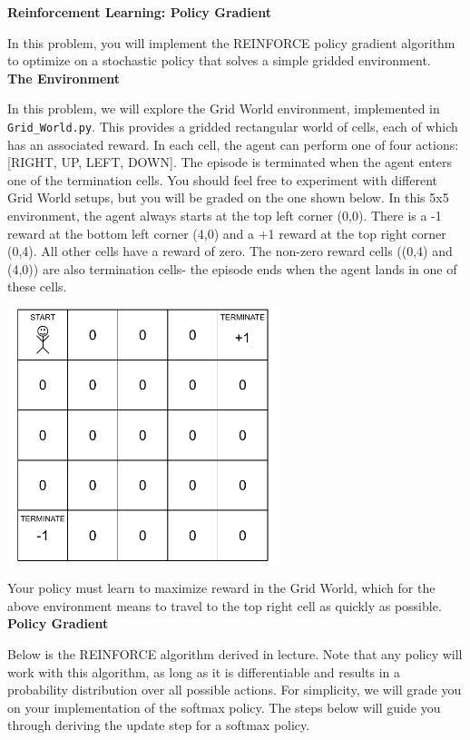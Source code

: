
\item {\bf Reinforcement Learning: Policy Gradient}

In this problem, you will implement the REINFORCE policy gradient algorithm to optimize on a stochastic policy that solves a simple gridded environment.\\

\textbf{The Environment}

In this problem, we will explore the Grid World environment, implemented in {\tt Grid\_World.py}.  This provides a gridded rectangular world of cells, each of which has an associated reward.  In each cell, the agent can perform one of four actions: [RIGHT, UP, LEFT, DOWN].  The episode is terminated when the agent enters one of the termination cells.  You should feel free to experiment with different Grid World setups, but you will be graded on the one shown below.  In this 5x5 environment, the agent always starts at the top left corner (0,0).  There is a -1 reward at the bottom left corner (4,0) and a +1 reward at the top right corner (0,4).  All other cells have a reward of zero.  The non-zero reward cells ((0,4) and (4,0)) are also termination cells- the episode ends when the agent lands in one of these cells.

\begin{center}
  \includegraphics[width=8cm]{policy-gradient/Grid_World.pdf}
\end{center}

Your policy must learn to maximize reward in the Grid World, which for the above environment means to travel to the top right cell as quickly as possible.\\

\textbf{Policy Gradient}

Below is the REINFORCE algorithm derived in lecture.  Note that any policy will work with this algorithm, as long as it is differentiable and results in a probability distribution over all possible actions.  For simplicity, we will grade you on your implementation of the softmax policy.  The steps below will guide you through deriving the update step for a softmax policy.


